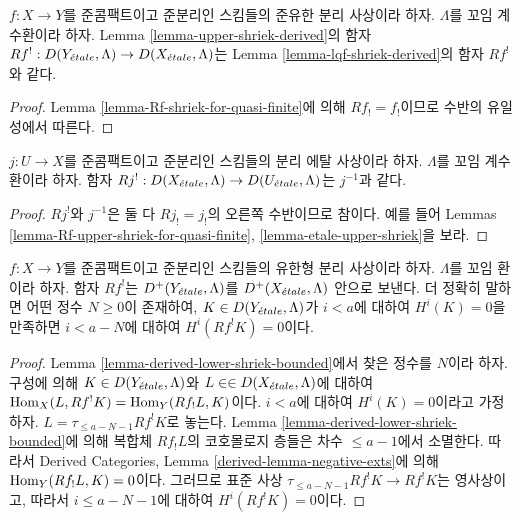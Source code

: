 \begin{lemma}
\label{lemma-Rf-upper-shriek-for-quasi-finite}
$f : X \to Y$를 준콤팩트이고 준분리인 스킴들의 준유한 분리 사상이라
하자. $\Lambda$를 꼬임 계수환이라 하자. Lemma
\ref{lemma-upper-shriek-derived}의 함자
$Rf^! : D(Y_{\acute{e}tale}, \Lambda) \to D(X_{\acute{e}tale}, \Lambda)$는
Lemma \ref{lemma-lqf-shriek-derived}의 함자 $Rf^!$와 같다.
\end{lemma}

\begin{proof}
Lemma \ref{lemma-Rf-shriek-for-quasi-finite}에 의해 $Rf_! = f_!$이므로
수반의 유일성에서 따른다.
\end{proof}

\begin{lemma}
\label{lemma-Rf-upper-shriek-for-etale}
$j : U \to X$를 준콤팩트이고 준분리인 스킴들의 분리 에탈 사상이라
하자. $\Lambda$를 꼬임 계수환이라 하자. 함자
$Rj^! : D(X_{\acute{e}tale}, \Lambda) \to D(U_{\acute{e}tale}, \Lambda)$는
$j^{-1}$과 같다.
\end{lemma}

\begin{proof}
$Rj^!$와 $j^{-1}$은 둘 다 $Rj_! = j_!$의 오른쪽 수반이므로 참이다.
예를 들어 Lemmas \ref{lemma-Rf-upper-shriek-for-quasi-finite},
\ref{lemma-etale-upper-shriek}을 보라.
\end{proof}

\begin{lemma}
\label{lemma-twisted-inverse-image-bounded-below}
$f : X \to Y$를 준콤팩트이고 준분리인 스킴들의 유한형 분리 사상이라
하자. $\Lambda$를 꼬임 환이라 하자. 함자 $Rf^!$는
$D^+(Y_{\acute{e}tale}, \Lambda)$를 $D^+(X_{\acute{e}tale}, \Lambda)$ 안으로 보낸다.
더 정확히 말하면 어떤 정수 $N \geq 0$이 존재하여,
$K \in D(Y_{\acute{e}tale}, \Lambda)$가 $i < a$에 대하여
$H^i(K) = 0$을 만족하면 $i < a - N$에 대하여
$H^i(Rf^!K) = 0$이다.
\end{lemma}

\begin{proof}
Lemma \ref{lemma-derived-lower-shriek-bounded}에서 찾은 정수를 $N$이라
하자. 구성에 의해 $K \in D(Y_{\acute{e}tale}, \Lambda)$와
$L \in \in D(X_{\acute{e}tale}, \Lambda)$에 대하여
$\mathop{\mathrm{Hom}}\nolimits_X(L, Rf^!K) = \mathop{\mathrm{Hom}}\nolimits_Y(Rf_!L, K)$이다.
$i < a$에 대하여 $H^i(K) = 0$이라고 가정하자.
$L = \tau_{\leq a - N - 1}Rf^!K$로 놓는다.
Lemma \ref{lemma-derived-lower-shriek-bounded}에 의해 복합체 $Rf_!L$의
코호몰로지 층들은 차수 $\leq a - 1$에서 소멸한다.
따라서 Derived Categories, Lemma
\ref{derived-lemma-negative-exts}에 의해
$\mathop{\mathrm{Hom}}\nolimits_Y(Rf_!L, K) = 0$이다.
그러므로 표준 사상
$\tau_{\leq a - N - 1}Rf^!K \to Rf^!K$는 영사상이고,
따라서 $i \leq a - N - 1$에 대하여 $H^i(Rf^!K) = 0$이다.
\end{proof}

